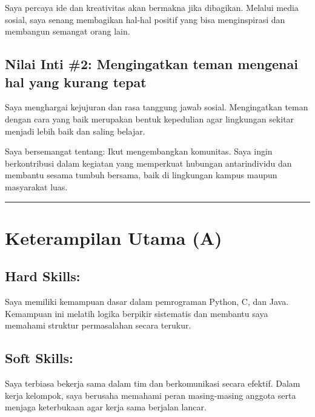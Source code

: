 \documentclass[
  letterpaper,
  DIV=11,
  numbers=noendperiod]{scrreprt}
\begin{document}
Saya percaya ide dan kreativitas akan bermakna jika dibagikan. Melalui
media sosial, saya senang membagikan hal-hal positif yang bisa
menginspirasi dan membangun semangat orang lain.

\subsection*{Nilai Inti \#2: Mengingatkan teman mengenai hal yang kurang
tepat}\label{nilai-inti-2-mengingatkan-teman-mengenai-hal-yang-kurang-tepat}

Saya menghargai kejujuran dan rasa tanggung jawab sosial. Mengingatkan
teman dengan cara yang baik merupakan bentuk kepedulian agar lingkungan
sekitar menjadi lebih baik dan saling belajar.

Saya bersemangat tentang: Ikut mengembangkan komunitas. Saya ingin
berkontribusi dalam kegiatan yang memperkuat hubungan antarindividu dan
membantu sesama tumbuh bersama, baik di lingkungan kampus maupun
masyarakat luas.

\begin{center}\rule{0.5\linewidth}{0.5pt}\end{center}

\section{Keterampilan Utama (A)}\label{keterampilan-utama-a}

\subsection*{\texorpdfstring{\textbf{Hard
Skills:}}{Hard Skills:}}\label{hard-skills}

Saya memiliki kemampuan dasar dalam pemrograman Python, C, dan Java.
Kemampuan ini melatih logika berpikir sistematis dan membantu saya
memahami struktur permasalahan secara terukur.

\subsection*{\texorpdfstring{\textbf{Soft
Skills:}}{Soft Skills:}}\label{soft-skills}

Saya terbiasa bekerja sama dalam tim dan berkomunikasi secara efektif.
Dalam kerja kelompok, saya berusaha memahami peran masing-masing anggota
serta menjaga keterbukaan agar kerja sama berjalan lancar.
\end{document}
